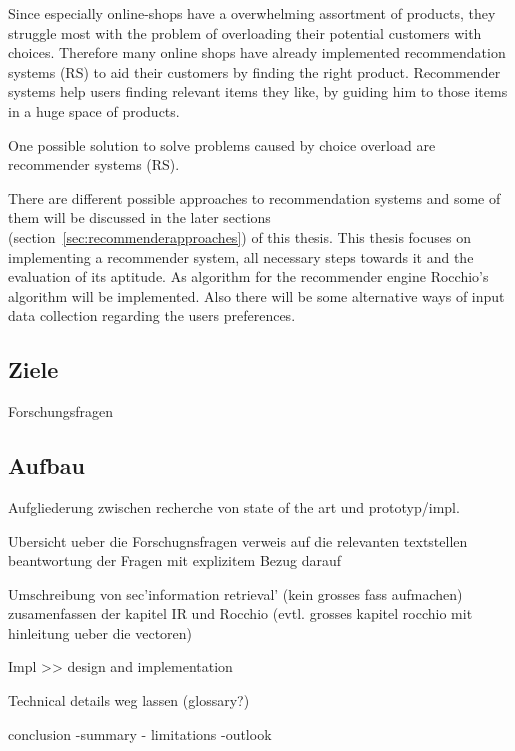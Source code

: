 Since especially online-shops have a overwhelming assortment of products, they struggle most with the problem of overloading their potential customers with choices.
Therefore many online shops have already implemented recommendation systems (RS) to aid their customers by finding the right product.
Recommender systems help users finding relevant items they like, by guiding him to those items in a huge space of products.\citep[p.~63]{bollen:2010}

One possible solution to solve problems caused by choice overload are recommender systems (RS).




There are different possible approaches to recommendation systems and some of them will be discussed in the later sections (section~\ref{sec:recommenderapproaches}) of this thesis.
This thesis focuses on implementing a recommender system, all necessary steps towards it and the evaluation of its aptitude.
As algorithm for the recommender engine Rocchio's algorithm will be implemented.
Also there will be some alternative ways of input data collection regarding the users preferences.




\subsection{Ziele}
{\color{red} Forschungsfragen}

\subsection{Aufbau}

{\color{red}
    Aufgliederung zwischen recherche von state of the art
    und prototyp/impl.



    Ubersicht ueber die Forschugnsfragen
    verweis auf die relevanten textstellen
    beantwortung der Fragen mit explizitem Bezug darauf

    Umschreibung von sec'information retrieval' (kein grosses fass aufmachen)
    zusamenfassen der kapitel IR und Rocchio (evtl. grosses kapitel rocchio mit hinleitung ueber die vectoren)


    Impl >> design and implementation

    Technical details weg lassen (glossary?)


    conclusion
        -summary
            - limitations
        -outlook
}
